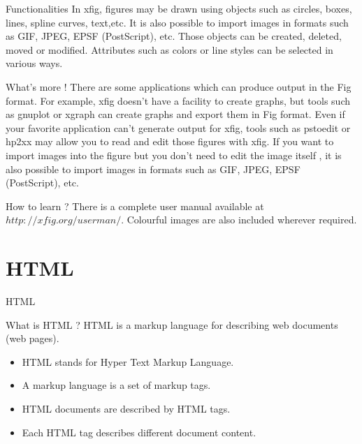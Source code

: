 \documentclass[pdf]{beamer}
\begin{document}
\begin{frame}
\begin{block}{Functionalities}
In xfig, figures may be drawn using objects such as circles, boxes, lines, spline curves, text,etc. It is also possible to import images in formats such as GIF, JPEG, EPSF (PostScript), etc. Those objects can be created, deleted, moved or modified. Attributes such as colors or line styles can be selected in various ways.
\end{block}
\end{frame}

\begin{frame}
\begin{block}{What's more !}
There are some applications which can produce output in the Fig format. For example, xfig doesn't have a facility to create graphs, but tools such as gnuplot or xgraph can create graphs and export them in Fig format. Even if your favorite application can't generate output for xfig, tools such as pstoedit or hp2xx may allow you to read and edit those figures with xfig. If you want to import images into the figure but you don't need to edit the image itself , it is also possible to import images in formats such as GIF, JPEG, EPSF (PostScript), etc.
\end{block}
\end{frame}

\begin{frame}
\begin{block}{How to learn ?}
There is a complete user manual available at $http://xfig.org/userman/$. Colourful images are also included wherever required.
\end{block}
\end{frame}

\section{HTML}

\begin{frame}{HTML}
	\begin{block}{What is HTML ?}
	HTML is a markup language for describing web documents (web pages).
	\begin{itemize}
	\item HTML stands for Hyper Text Markup Language.
	\item A markup language is a set of markup tags.
	\item HTML documents are described by HTML tags.
	\item Each HTML tag describes different document content.
	\end{itemize}
	\end{block}
\end{frame}
\end{document}
